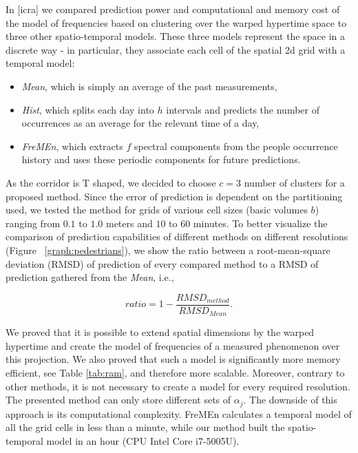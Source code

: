 In [icra] we compared prediction power and computational and memory cost of the model of frequencies based on clustering over the warped hypertime space 
to three other spatio-temporal models. 
These three models represent the space in a discrete way - in particular, they associate each cell of the spatial 2d grid with a temporal model: 
\begin{itemize}
    \item \textit{Mean}, which is simply an average of the past measurements, 
    \item \textit{Hist}, which splits each day into $h$ intervals and predicts the number of occurrences as an average for the relevant time of a day, 
    \item \textit{FreMEn}, which extracts $f$ spectral components from the people occurrence history and uses these periodic components for future predictions.
\end{itemize}
As the corridor is T shaped, we decided to choose $c = 3$ number of clusters for a proposed method. 
Since the error of prediction is dependent on the partitioning used, we tested the method for grids of various cell sizes (basic volumes $b$) ranging from $0.1$ to $1.0$ meters and $10$ to $60$ minutes.
To better visualize the comparison of prediction capabilities of different methods on different resolutions (Figure ~\ref{graph:pedestrians}), we show the ratio between a root-mean-square deviation \cite{hyndman2006another} (RMSD) of prediction of every compared method to a RMSD of prediction gathered from the \textit{Mean}, i.e.,

\begin{equation}\label{eq:ratio}
ratio = 1 - \frac{RMSD_{method}}{RMSD_{Mean}}.
\end{equation}



We proved that it is possible to extend spatial dimensions by the warped hypertime and create the model of frequencies of a measured phenomenon over this projection.
We also proved that such a model is significantly more memory efficient, see Table \ref{tab:ram},  and therefore more scalable.
Moreover, contrary to other methods, it is not necessary to create a model for every required resolution.
The presented method can only store different sets of $\alpha_{j}$.  
The downside of this approach is its computational complexity.
FreMEn calculates a temporal model of all the grid cells in less than a minute, while our method built the spatio-temporal model in an hour (CPU Intel Core i7-5005U).



